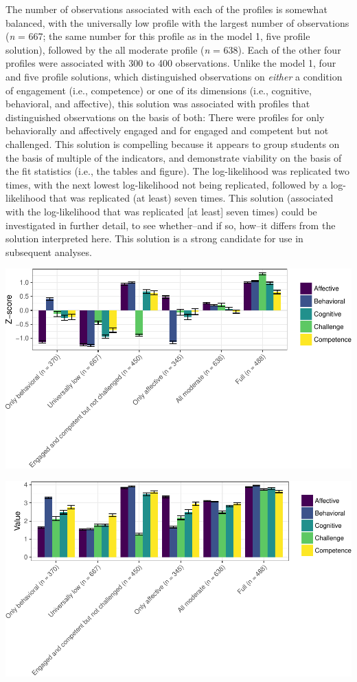 \documentclass[]{msu-thesis}
\theoremstyle{definition}
\theoremstyle{definition}
\theoremstyle{definition}
\theoremstyle{remark}
\begin{document}
The number of observations associated with each of the profiles is
somewhat balanced, with the universally low profile with the largest
number of observations (\emph{n} = 667; the same number for this profile
as in the model 1, five profile solution), followed by the all moderate
profile (\emph{n} = 638). Each of the other four profiles were
associated with 300 to 400 observations. Unlike the model 1, four and
five profile solutions, which distinguished observations on
\emph{either} a condition of engagement (i.e., competence) or one of its
dimensions (i.e., cognitive, behavioral, and affective), this solution
was associated with profiles that distinguished observations on the
basis of both: There were profiles for only behaviorally and affectively
engaged and for engaged and competent but not challenged. This solution
is compelling because it appears to group students on the basis of
multiple of the indicators, and demonstrate viability on the basis of
the fit statistics (i.e., the tables and figure). The log-likelihood was
replicated two times, with the next lowest log-likelihood not being
replicated, followed by a log-likelihood that was replicated (at least)
seven times. This solution (associated with the log-likelihood that was
replicated {[}at least{]} seven times) could be investigated in further
detail, to see whether--and if so, how--it differs from the solution
interpreted here. This solution is a strong candidate for use in
subsequent analyses.

\begin{center}\includegraphics[width=0.95\linewidth]{rosenberg-dissertation_files/figure-latex/m1_6p-1} \end{center}

\begin{center}\includegraphics[width=0.95\linewidth]{rosenberg-dissertation_files/figure-latex/m1_6p-2} \end{center}
\end{document}
